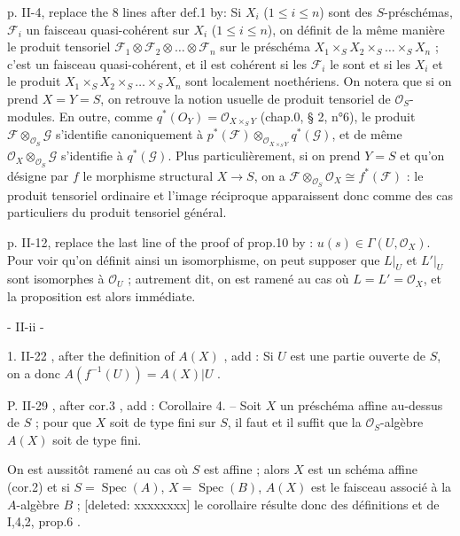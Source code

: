 p. II-4, replace the 8 lines after def.1 by:
Si $X_i$ ($1 \leq i \leq n$) sont des $S$-préschémas, $\mathcal{F}_i$ un faisceau quasi-cohérent sur $X_i$ ($1 \leq i \leq n$), on définit de la même manière le produit tensoriel $\mathcal{F}_1 \otimes \mathcal{F}_2 \otimes \dots \otimes \mathcal{F}_n$ sur le préschéma $X_1 \times_S X_2 \times_S \dots \times_S X_n$ ; c'est un faisceau quasi-cohérent, et il est cohérent si les $\mathcal{F}_i$ le sont et si les $X_i$ et le produit $X_1 \times_S X_2 \times_S \dots \times_S X_n$ sont localement noethériens.
On notera que si on prend $X=Y=S$, on retrouve la notion usuelle de produit tensoriel de $\mathcal{O}_S$-modules. En outre, comme $q^*(O_Y)=\mathcal{O}_{X \times_S Y}$ (chap.0, § 2, n°6), le produit $\mathcal{F} \otimes_{\mathcal{O}_S} \mathcal{G}$ s'identifie canoniquement à $p^*(\mathcal{F}) \otimes_{\mathcal{O}_{X \times_S Y}} q^*(\mathcal{G})$, et de même $\mathcal{O}_X \otimes_{\mathcal{O}_S} \mathcal{G}$ s'identifie à $q^*(\mathcal{G})$. Plus particulièrement, si on prend $Y=S$ et qu'on désigne par $f$ le morphisme structural $X \to S$, on a $\mathcal{F} \otimes_{\mathcal{O}_S} \mathcal{O}_X \cong f^*(\mathcal{F})$ : le produit tensoriel ordinaire et l'image réciproque apparaissent donc comme des cas particuliers du produit tensoriel général.

p. II-12, replace the last line of the proof of prop.10 by :
$u(s) \in \Gamma(U, \mathcal{O}_X)$. Pour voir qu'on définit ainsi un isomorphisme, on peut supposer que $L|_U$ et $L'|_U$ sont isomorphes à $\mathcal{O}_U$ ; autrement dit, on est ramené au cas où $L=L'=\mathcal{O}_X$, et la proposition est alors immédiate.

\newpage


- II-ii -

1. II-22 , after the definition of $A(X)$ , add :
Si $U$ est une partie ouverte de $S$, on a donc $A(f^{-1}(U)) = A(X)|U$ .

P. II-29 , after cor.3 , add :
Corollaire 4. -- Soit $X$ un préschéma affine au-dessus de $S$ ; pour que $X$ soit de type fini sur $S$, il faut et il suffit que la $\mathcal{O}_S$-algèbre $A(X)$ soit de type fini.

On est aussitôt ramené au cas où $S$ est affine ; alors $X$ est un schéma affine (cor.2) et si $S = \operatorname{Spec}(A)$, $X = \operatorname{Spec}(B)$, $A(X)$ est le faisceau associé à la $A$-algèbre $B$ ; [deleted: xxxxxxxx] le corollaire résulte donc des définitions et de I,4,2, prop.6 .


